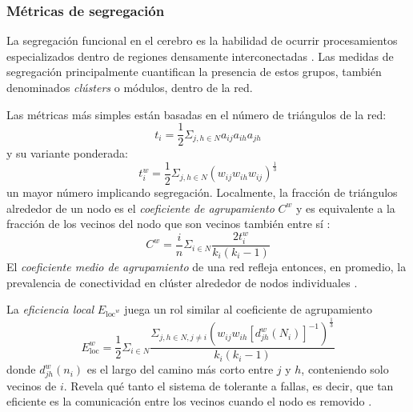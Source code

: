 \subsubsection{Métricas de segregación}
La segregación funcional en el cerebro es la habilidad de ocurrir procesamientos especializados dentro de regiones densamente interconectadas \parencite{Tononi1994}.
Las medidas de segregación principalmente cuantifican la presencia de estos grupos, también denominados \textit{clústers} o módulos, dentro de la red. \par
Las métricas más simples están basadas en el número de triángulos de la red:
\begin{equation}\label{eqTriangles1}
    t_i=\frac{1}{2}\Sigma_{j,h \in N}a_{ij}a_{ih}a_{jh}
\end{equation}
y su variante ponderada:
\begin{equation}\label{eqTriangles2}
    t_i^w=\frac{1}{2}\Sigma_{j,h \in N}(w_{ij}w_{ih}w_{ij})^{\frac{1}{3}}
\end{equation}
un mayor número implicando segregación.
Localmente, la fracción de triángulos alrededor de un nodo es el \emph{coeficiente de agrupamiento} $C^w$ y es equivalente a la fracción de los vecinos del nodo que son vecinos también entre sí \parencite{Watts1998,Onnela2005}:
\begin{equation}\label{eqClusterCoeff}
    C^w=\frac{i}{n}\Sigma_{i \in N}\frac{2t_i^w}{k_i(k_i-1)}
\end{equation}
El \emph{coeficiente medio de agrupamiento} de una red refleja entonces, en promedio, la prevalencia de conectividad en clúster alrededor de nodos individuales \parencite{Rubinov2010}. \par
La \emph{eficiencia local} $E_{\text{loc}^w}$ juega un rol similar al coeficiente de agrupamiento
\begin{equation}\label{eqEloc}
    E_{\text{loc}}^w=\frac{1}{2}\Sigma_{i \in N}\frac{\Sigma_{j,h \in N, j \neq i}(w_{ij}w_{ih}[d_{jh}^w(N_i)]^{-1})^\frac{1}{3}}{k_i(k_i-1)}
\end{equation}
donde $d_{jh}^w(n_i)$ es el largo del camino más corto entre $j$ y $h$, conteniendo solo vecinos de $i$. Revela qué tanto el sistema de tolerante a fallas, es decir, que tan eficiente es la comunicación entre los vecinos cuando el nodo es removido \parencite{Latora2001}.

